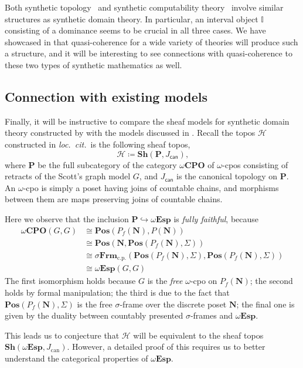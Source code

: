 \documentclass[a4paper,12pt]{amsart}
\theoremstyle{definition}
\newcommand{\mc}[1]{\mathcal{#1}}
\newcommand{\mb}[1]{\mathbf{#1}}
\newcommand{\mbb}[1]{\mathbb{#1}}
\newcommand{\I}{\mbb I}
\newcommand{\mr}[1]{\mathrm{#1}}
\newcommand{\ms}[1]{\mathsf{#1}}
\newcommand{\Pos}{\mb{Pos}}
\newcommand{\sh}{\mb{Sh}}
\newcommand{\hook}{\hookrightarrow}
\newcommand{\cp}{_{\mr{c.p.}}}
\newcommand{\N}{\mb N}
\newcommand{\wCPO}{\omega\mb{CPO}}
\newcommand{\sFrm}{\sigma\mb{Frm}}
\newcommand{\wTop}{\omega\mb{Esp}}
\begin{document}
Both synthetic topology~\citep{bauer2009dedekind} and synthetic computability theory~\citep{RN552} involve similar structures as synthetic domain theory. In particular, an interval object $\I$ consisting of a dominance seems to be crucial in all three cases. We have showcased in  that quasi-coherence for a wide variety of theories will produce such a structure, and it will be interesting to see connections with quasi-coherence to these two types of synthetic mathematics as well.

\subsection{Connection with existing models}\label{subsec:compare}

Finally, it will be instructive to compare the sheaf models for synthetic domain theory constructed by \citet{FIORE1997151} with the models discussed in . Recall the topos $\mc H$ constructed in \emph{loc.\ cit.}\ is the following sheaf topos,
\[ \mc H \coloneq \sh(\mb P,J_{\ms{can}})\text{,} \]
where $\mb P$ be the full subcategory of the category $\wCPO$ of $\omega$-cpos consisting of retracts of the Scott's graph model $G$, and $J_{\ms{can}}$ is the canonical topology on $\mb P$. An $\omega$-cpo is simply a poset having joins of countable chains, and morphisms between them are maps preserving joins of countable chains.

Here we observe that the inclusion $\mb P \hook \wTop$ is \emph{fully faithful}, because
\begin{align*}
  \wCPO(G,G)
  &\cong \Pos(P_f(\N),P(\N)) \\
  &\cong \Pos(\N,\Pos(P_f(\N),\Sigma)) \\
  &\cong \sFrm\cp(\Pos(P_f(\N),\Sigma),\Pos(P_f(\N),\Sigma)) \\ 
  &\cong \wTop(G,G)
\end{align*}
The first isomorphism holds because $G$ is the \emph{free} $\omega$-cpo on $P_f(\N)$; the second holds by formal manipulation; the third is due to the fact that $\Pos(P_f(\N),\Sigma)$ is the free $\sigma$-frame over the discrete poset $\N$; the final one is given by the duality between countably presented $\sigma$-frames and $\wTop$. 

This leads us to conjecture that $\mc H$ will be equivalent to the sheaf topos $\sh(\wTop,J_{\mr{can}})$. However, a detailed proof of this requires us to better understand the categorical properties of $\wTop$.

 

\end{document}
